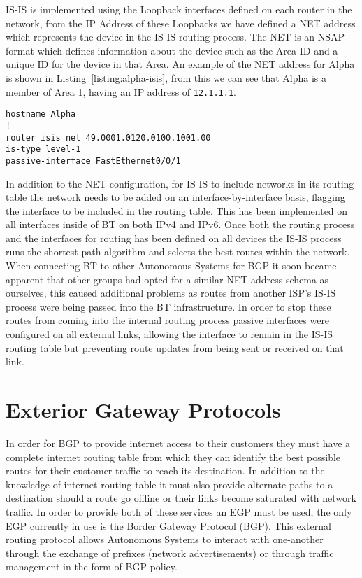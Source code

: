 IS-IS is implemented using the Loopback interfaces defined on each router in the
network, from the IP Address of these Loopbacks we have defined a NET address
which represents the device in the IS-IS routing process. The NET is an NSAP
format which defines information about the device such as the Area ID and a
unique ID for the device in that Area. An example of the NET address for Alpha
is shown in Listing~\ref{listing:alpha-isis}, from this we can see that Alpha is
a member of Area 1, having an IP address of \texttt{12.1.1.1}.

\begin{lstlisting}[caption={Alpha IS-IS Configuration}, label={listing:alpha-isis}]
hostname Alpha 
!  
router isis net 49.0001.0120.0100.1001.00  
is-type level-1  
passive-interface FastEthernet0/0/1  
\end{lstlisting}

In addition to the NET configuration, for IS-IS to include networks in its
routing table the network needs to be added on an interface-by-interface basis,
flagging the interface to be included in the routing table. This has been
implemented on all interfaces inside of BT on both IPv4 and IPv6. Once both the
routing process and the interfaces for routing has been defined on all devices
the IS-IS process runs the shortest path algorithm and selects the best routes
within the network. When connecting BT to other Autonomous Systems for BGP it
soon became apparent that other groups had opted for a similar NET address
schema as ourselves, this caused additional problems as routes from another
ISP's IS-IS process were being passed into the BT infrastructure. In order to
stop these routes from coming into the internal routing process passive
interfaces were configured on all external links, allowing the interface to
remain in the IS-IS routing table but preventing route updates from being sent
or received on that link.

\section{Exterior Gateway Protocols} In order for BGP to provide internet access
to their customers they must have a complete internet routing table from which
they can identify the best possible routes for their customer traffic to reach
its destination. In addition to the knowledge of internet routing table it must
also provide alternate paths to a destination should a route go offline or their
links become saturated with network traffic. In order to provide both of these
services an EGP must be used, the only EGP currently in use is the Border
Gateway Protocol (BGP). This external routing protocol allows Autonomous Systems
to interact with one-another through the exchange of prefixes (network
advertisements) or through traffic management in the form of BGP policy.

